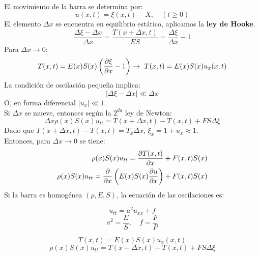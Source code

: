 \documentclass[../main]{subfiles}
\begin{document}
\begin{enumerate}
\begin{minipage}{0.5\textwidth}
    \end{minipage}
    \\[0.5cm]
    El movimiento de la barra se determina por:
    \begin{equation}
        u(x,t)=\xi(x,t)-X, \quad (t\geq 0)
    \end{equation}
    El elemento $\Delta x$ se encuentra en equilibrio estático, aplicamos la \textbf{ley de Hooke}.
    \begin{equation}
        \dfrac{\Delta \xi -\Delta x}{\Delta x}=\dfrac{T(x+\Delta x,t)}{ES}=\dfrac{\Delta \xi}{\Delta x}-1
    \end{equation}
    Para $\Delta x \rightarrow 0$:
    \begin{equation}
        T(x,t)=E(x)S(x)\left(\pdv{\xi}{x}-1\right) \rightarrow \ T(x,t)=E(x)S(x)u_x(x,t)
    \end{equation}
    La condición de oscilación pequeña implica:
    \begin{equation}
        |\Delta \xi - \Delta x| \ll \Delta x
    \end{equation}
    O, en forma diferencial $|u_x|\ll 1$.\\
    Si $\Delta x$ se mueve, entonces según la $2^{da}$ ley de Newton:
    \begin{equation}
        \Delta x \rho(x)S(x)u_{tt}=T(x+\Delta x,t)-T(x,t)+FS\Delta \xi
    \end{equation}
    Dado que $T(x+\Delta x,t)-T(x,t)=T_x \Delta x$, $\xi_x =1+u_x \approx 1$. \\
    Entonces, para $\Delta x \rightarrow 0$ se tiene:
    \begin{align}
        \rho(x)S(x) u_{tt}=\pdv{T(x,t)}{x}+F(x,t)S(x) \\
        \rho(x)S(x) u_{tt}=\pdv{}{x}\left( E(x)S(x)\pdv{u}{x}\right)+F(x,t)S(x)
    \end{align}
    Si la barra es homogénea $(\rho, E, S)$, la ecuación de las oscilaciones es: \\
    \begin{minipage}{0.5\textwidth}
     \begin{equation}
        u_{tt}=a^2 u_{xx}+f
     \end{equation}   
     \begin{equation}
         a^2=\dfrac{E}{S}, \quad f=\dfrac{F}{P}
     \end{equation}
    \end{minipage}
    \begin{minipage}{0.5\textwidth}
     \begin{equation}
         T(x,t)=E(x)S(x) u_x (x,t)
     \end{equation}
     \begin{equation}
         \rho(x)S(x)u_{tt}=T(x+\Delta x,t)-T(x,t)+FS\Delta \xi
     \end{equation}
    \end{minipage}
    \\[0.5cm]

\end{enumerate}
\end{document}
